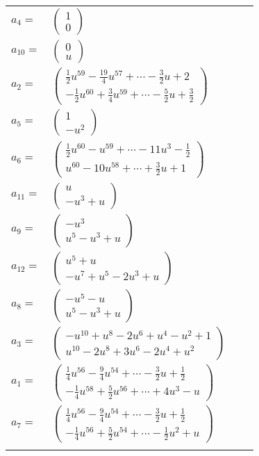 \documentclass[1p]{elsarticle_modified}
\theoremstyle{definition}
\begin{document}
\begin{tabular}{m{7pt} m{180pt} m{7pt} m{180pt} }
\flushright $a_{4}=$&$\begin{pmatrix}1\\0\end{pmatrix}$ \\
\flushright $a_{10}=$&$\begin{pmatrix}0\\u\end{pmatrix}$ \\
\flushright $a_{2}=$&$\begin{pmatrix}\frac{1}{2} u^{59}-\frac{19}{4} u^{57}+\cdots-\frac{3}{2} u+2\\-\frac{1}{2} u^{60}+\frac{3}{4} u^{59}+\cdots-\frac{5}{2} u+\frac{3}{2}\end{pmatrix}$ \\
\flushright $a_{5}=$&$\begin{pmatrix}1\\- u^2\end{pmatrix}$ \\
\flushright $a_{6}=$&$\begin{pmatrix}\frac{1}{2} u^{60}- u^{59}+\cdots-11 u^3-\frac{1}{2}\\u^{60}-10 u^{58}+\cdots+\frac{3}{2} u+1\end{pmatrix}$ \\
\flushright $a_{11}=$&$\begin{pmatrix}u\\- u^3+u\end{pmatrix}$ \\
\flushright $a_{9}=$&$\begin{pmatrix}- u^3\\u^5- u^3+u\end{pmatrix}$ \\
\flushright $a_{12}=$&$\begin{pmatrix}u^5+u\\- u^7+u^5-2 u^3+u\end{pmatrix}$ \\
\flushright $a_{8}=$&$\begin{pmatrix}- u^5- u\\u^5- u^3+u\end{pmatrix}$ \\
\flushright $a_{3}=$&$\begin{pmatrix}- u^{10}+u^8-2 u^6+u^4- u^2+1\\u^{10}-2 u^8+3 u^6-2 u^4+u^2\end{pmatrix}$ \\
\flushright $a_{1}=$&$\begin{pmatrix}\frac{1}{4} u^{56}-\frac{9}{4} u^{54}+\cdots-\frac{3}{2} u+\frac{1}{2}\\-\frac{1}{4} u^{58}+\frac{5}{2} u^{56}+\cdots+4 u^3- u\end{pmatrix}$ \\
\flushright $a_{7}=$&$\begin{pmatrix}\frac{1}{4} u^{56}-\frac{9}{4} u^{54}+\cdots-\frac{3}{2} u+\frac{1}{2}\\-\frac{1}{4} u^{56}+\frac{5}{2} u^{54}+\cdots-\frac{1}{2} u^2+u\end{pmatrix}$\\&\end{tabular}
\end{document}
